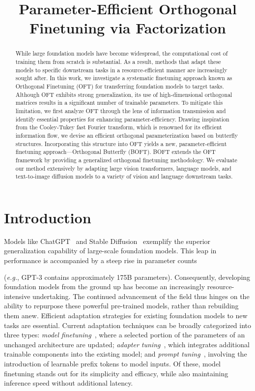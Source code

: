 \title{Parameter-Efficient Orthogonal Finetuning via Factorization}

\begin{abstract}
While large foundation models have become widespread, the computational cost of training them from scratch is substantial. As a result, methods that adapt these models to specific downstream tasks in a resource-efficient manner are increasingly sought after. In this work, we investigate a systematic finetuning approach known as Orthogonal Finetuning (OFT) for transferring foundation models to target tasks. Although OFT exhibits strong generalization, its use of high-dimensional orthogonal matrices results in a significant number of trainable parameters. To mitigate this limitation, we first analyze OFT through the lens of information transmission and identify essential properties for enhancing parameter-efficiency. Drawing inspiration from the Cooley-Tukey fast Fourier transform, which is renowned for its efficient information flow, we devise an efficient orthogonal parameterization based on butterfly structures. Incorporating this structure into OFT yields a new, parameter-efficient finetuning approach—Orthogonal Butterfly (BOFT). BOFT extends the OFT framework by providing a generalized orthogonal finetuning methodology. We evaluate our method extensively by adapting large vision transformers, language models, and text-to-image diffusion models to a variety of vision and language downstream tasks.
\end{abstract}

\section{Introduction}

Models like ChatGPT~\cite{brown2020language,chen2021evaluating} and Stable Diffusion~\cite{rombach2022high} exemplify the superior generalization capability of large-scale foundation models. This leap in performance is accompanied by a steep rise in parameter counts 

(\emph{e.g.}, GPT-3 contains approximately 175B parameters). Consequently, developing foundation models from the ground up has become an increasingly resource-intensive undertaking. The continued advancement of the field thus hinges on the ability to repurpose these powerful pre-trained models, rather than rebuilding them anew. Efficient adaptation strategies for existing foundation models to new tasks are essential. Current adaptation techniques can be broadly categorized into three types: \emph{model finetuning}~\cite{hulora2022,zaken2022bitfit,guo2020parameter,raffel2020exploring,qiu2023controlling,zhang2022adaptive,chavan2023one}, where a selected portion of the parameters of an unchanged architecture are updated; \emph{adapter tuning}~\cite{rebuffi2017learning,houlsby2019parameter,pfeiffer2020adapterfusion,lin2020exploring,he2021towards}, which integrates additional trainable components into the existing model; and \emph{prompt tuning}~\cite{li2021prefix,lester2021power}, involving the introduction of learnable prefix tokens to model inputs. Of these, model finetuning stands out for its simplicity and efficacy, while also maintaining inference speed without additional latency.

